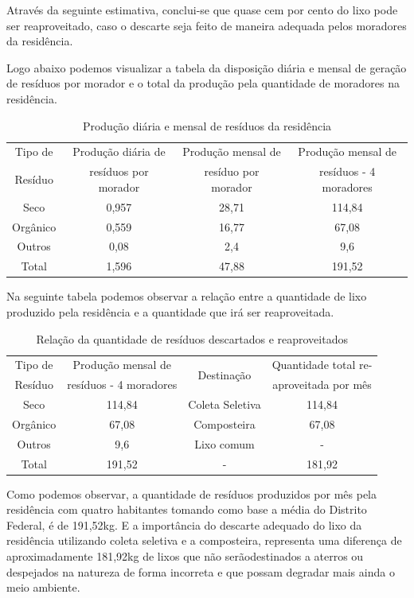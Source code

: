 	Através da seguinte estimativa, conclui-se que quase cem por cento do lixo pode ser reaproveitado, caso o descarte seja feito de maneira adequada pelos moradores da residência.

	Logo abaixo podemos visualizar a tabela da disposição diária e mensal de geração de resíduos por morador e o total da produção pela quantidade de moradores na residência.

\begin{table}[H]
\centering
\begin{tabular}{|c|c|c|c|}
\hline 
Tipo de & \multicolumn{1}{c|}{Produção diária de} & Produção mensal de & Produção mensal de\tabularnewline
Resíduo & resíduos por morador & resíduo por morador & resíduos - 4 moradores\tabularnewline
\hline 
\hline 
Seco & 0,957 & 28,71 & 114,84\tabularnewline
\hline 
Orgânico & 0,559 & 16,77 & 67,08\tabularnewline
\hline 
Outros & 0,08 & 2,4 & 9,6\tabularnewline
\hline 
Total & 1,596 & 47,88 & 191,52\tabularnewline
\hline 
\end{tabular}
\caption{Produção diária e mensal de resíduos da residência}
\end{table}

Na seguinte tabela podemos observar a relação entre a quantidade de lixo produzido pela residência e a quantidade que irá ser reaproveitada.


\begin{table}[H]
\centering
\begin{tabular}{|c|c|c|c|}
\hline 
Tipo de & \multicolumn{1}{c|}{Produção mensal de} & \multirow{2}{*}{Destinação} & Quantidade total re-\tabularnewline
Resíduo & resíduos - 4 moradores &  & aproveitada por mês\tabularnewline
\hline 
\hline 
Seco & 114,84 & Coleta Seletiva & 114,84\tabularnewline
\hline 
Orgânico & 67,08 & Composteira & 67,08\tabularnewline
\hline 
Outros & 9,6 & Lixo comum & -\tabularnewline
\hline 
Total & 191,52 & - & 181,92\tabularnewline
\hline 
\end{tabular}
\caption{Relação da quantidade de resíduos descartados e reaproveitados}
\end{table}

Como podemos observar, a quantidade de resíduos produzidos por mês pela residência com quatro habitantes tomando como base a média do Distrito Federal, é de 191,52kg. E a importância do descarte adequado do lixo da residência utilizando coleta seletiva e a composteira, representa uma diferença de aproximadamente 181,92kg de lixos que não serãodestinados a aterros ou despejados na natureza de forma incorreta e que possam degradar mais ainda o meio ambiente.


